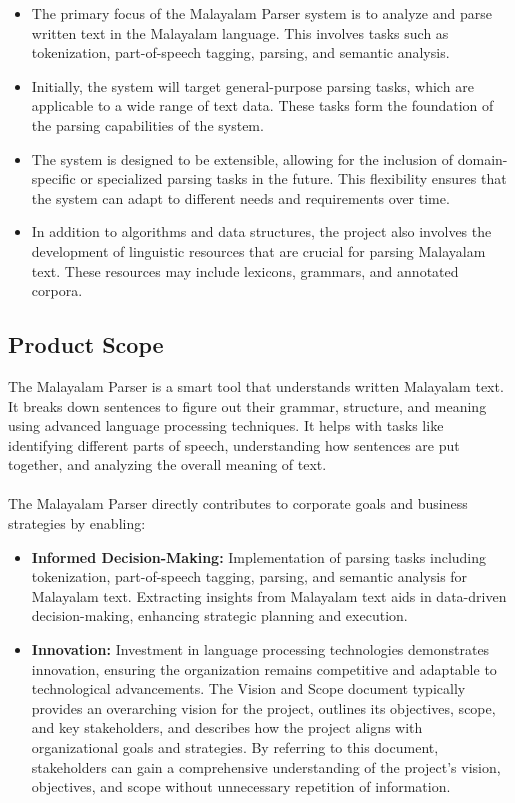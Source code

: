 \documentclass[12pt]{article}
\begin{document}
	\begin{itemize}[label=-]
		\item The primary focus of the Malayalam Parser system is to analyze and parse written text in the Malayalam language. This involves tasks such as tokenization, part-of-speech tagging, parsing, and semantic analysis.
		\item Initially, the system will target general-purpose parsing tasks, which are applicable to a wide range of text data. These tasks form the foundation of the parsing capabilities of the system.
		\item The system is designed to be extensible, allowing for the inclusion of domain-specific or specialized parsing tasks in the future. This flexibility ensures that the system can adapt to different needs and requirements over time.
		\item In addition to algorithms and data structures, the project also involves the development of linguistic resources that are crucial for parsing Malayalam text. These resources may include lexicons, grammars, and annotated corpora.
	\end{itemize}
	
	\subsection{Product Scope}
	The Malayalam Parser is a smart tool that understands written Malayalam text. It breaks
	down sentences to figure out their grammar, structure, and meaning using advanced
	language processing techniques. It helps with tasks like identifying different parts of
	speech, understanding how sentences are put together, and analyzing the overall meaning
	of text.\\\\
	The Malayalam Parser directly contributes to corporate goals and business strategies by
	enabling:
	
	\begin{itemize}[label=-]
		\item \textbf{Informed Decision-Making:} Implementation of parsing tasks including tokenization, part-of-speech tagging, parsing, and semantic analysis for Malayalam text. Extracting insights from Malayalam text aids in	data-driven decision-making, enhancing strategic planning and execution.
		
		\item \textbf{Innovation:} Investment in language processing technologies demonstrates innovation, ensuring the organization remains competitive and adaptable to technological advancements. The Vision and Scope document typically provides an	overarching vision for the project, outlines its objectives, scope, and key	stakeholders, and describes how the project aligns with organizational goals and strategies. By referring to this document, stakeholders can gain a comprehensive understanding of the project's vision, objectives, and scope without unnecessary	repetition of information.
	\end{itemize}
\end{document}
